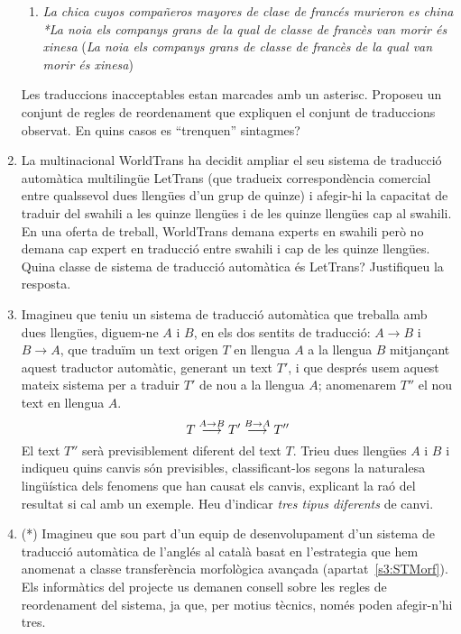 \begin{enumerate}
\begin{enumerate}
\item \emph{La chica cuyos compañeros mayores de clase de francés murieron es
    china} \newline \emph{*La noia els companys grans de la qual de
    classe de
    francès van morir és xinesa} \newline (\emph{La noia els companys grans
    de classe de francès de la qual van morir és xinesa})

\end{enumerate}
Les traduccions inacceptables estan marcades amb un asterisc.
Proposeu un conjunt de regles de reordenament que expliquen el conjunt de
traduccions observat. En quins casos es ``trenquen'' sintagmes?

\item La multinacional WorldTrans ha decidit ampliar el seu sistema de
  traducció automàtica multilingüe LetTrans (que tradueix
  correspondència comercial entre qualssevol dues llengües d'un grup
  de quinze) i afegir-hi la capacitat de traduir del swahili a les
  quinze llengües i de les quinze llengües cap al swahili. En una
  oferta de treball, WorldTrans demana experts en swahili però no
  demana cap expert en traducció entre swahili i cap de les quinze
  llengües. Quina classe de sistema de traducció automàtica és
  LetTrans?  Justifiqueu la resposta.

  \item Imagineu que teniu un sistema de traducció automàtica que
    treballa amb dues llengües, diguem-ne $A$ i $B$, en els dos
    sentits de traducció: $A{\rightarrow}B$ i $B{\rightarrow}A$, que
    traduïm un text origen $T$ en llengua $A$ a la llengua $B$
    mitjançant aquest traductor automàtic, generant un text $T'$, i
    que després usem aquest mateix sistema per a traduir $T'$ de nou a
    la llengua $A$; anomenarem $T''$ el nou text en llengua $A$.
      \begin{equation}
        T \stackrel{\scriptsize A\rightarrow
        B}{\longrightarrow}T'\stackrel{\scriptsize B\rightarrow
        A}{\longrightarrow} T''
      \end{equation}
      El text $T''$ serà previsiblement diferent del text $T$.  Trieu
      dues llengües $A$ i $B$ i indiqueu quins canvis són previsibles,
      classificant-los segons la naturalesa lingüística dels fenomens
      que han causat els canvis, explicant la raó del resultat si cal
      amb un exemple. Heu d'indicar \emph{tres tipus diferents} de
      canvi.

    \item (*) Imagineu que sou part d'un equip de desenvolupament d'un
      sistema de traducció automàtica de l'anglés al català basat en
      l'estrategia que hem anomenat a classe transferència morfològica
      avançada (apartat~\ref{s3:STMorf}). Els informàtics del projecte us demanen consell sobre
      les regles de reordenament del sistema, ja que, per motius
      tècnics, només poden afegir-n'hi tres.
      

\end{enumerate}
